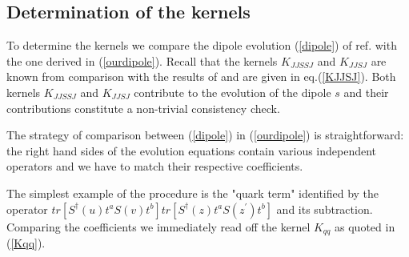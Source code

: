 \documentclass[11pt,a4paper]{article}
\begin{document}
 \subsection*{Determination of the kernels}

To determine the kernels we compare the dipole evolution (\ref{dipole}) of ref. \cite{BC} with the one
derived in (\ref{ourdipole}). Recall that the kernels $K_{JJSSJ}$ and $K_{JJSJ}$ are known from comparison with the results of \cite{Grab} and are given in
eq.(\ref{KJJSJ}). Both kernels $K_{JJSSJ}$ and $K_{JJSJ}$ contribute to the evolution of the dipole $s$ and their contributions constitute a non-trivial consistency check. 

The strategy of comparison between (\ref{dipole})  in (\ref{ourdipole}) is straightforward: the right hand sides of the evolution equations
contain various independent operators and we have to match their respective coefficients. 

The simplest example of the procedure is the "quark term"
identified by the operator 
$tr\left[S^{\dagger}(u)t^{a}S(v)t^{b}\right]tr\left[S^{\dagger}(z)t^{a}S(z^{\prime})t^{b}\right]$ and its subtraction.
Comparing the coefficients we immediately read off the kernel $K_{qq}$ as quoted in (\ref{Kqq}).
\end{document}
